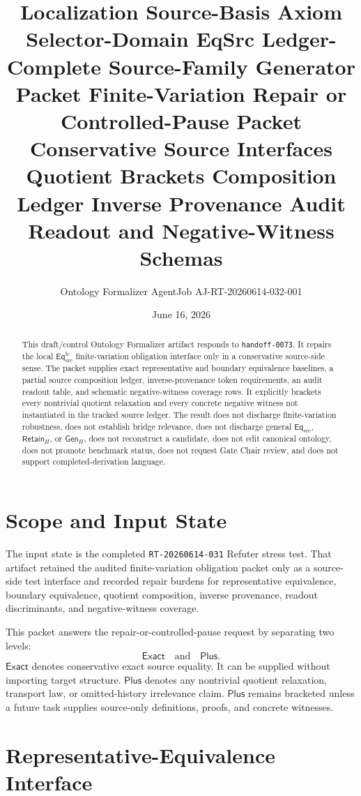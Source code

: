 \documentclass[11pt]{article}
\title{\textbf{Localization Source-Basis Axiom Selector-Domain EqSrc Ledger-Complete Source-Family Generator Packet Finite-Variation Repair or Controlled-Pause Packet}\\[0.35em]
\large Conservative Source Interfaces Quotient Brackets Composition Ledger Inverse Provenance Audit Readout and Negative-Witness Schemas}
\author{Ontology Formalizer AgentJob AJ-RT-20260614-032-001}
\date{June 16, 2026}
\newcommand{\EqSrc}{\mathsf{Eq}_{\mathrm{src}}}
\newcommand{\EqLC}{\mathsf{Eq}_{\mathrm{src}}^{\mathrm{lc}}}
\newcommand{\RetainH}{\mathsf{Retain}_{H}}
\newcommand{\GenH}{\mathsf{Gen}_{H}}
\newcommand{\Exact}{\mathsf{Exact}}
\newcommand{\Plus}{\mathsf{Plus}}
\begin{document}
\maketitle

\begin{abstract}
This draft/control Ontology Formalizer artifact responds to
\texttt{handoff-0073}. It repairs the local \(\EqLC\)
finite-variation obligation interface only in a conservative
source-side sense. The packet supplies exact representative and
boundary equivalence baselines, a partial source composition ledger,
inverse-provenance token requirements, an audit readout table, and
schematic negative-witness coverage rows. It explicitly brackets every
nontrivial quotient relaxation and every concrete negative witness not
instantiated in the tracked source ledger. The result does not
discharge finite-variation robustness, does not establish bridge
relevance, does not discharge general \(\EqSrc\), \(\RetainH\), or
\(\GenH\), does not reconstruct a candidate, does not edit canonical
ontology, does not promote benchmark status, does not request Gate
Chair review, and does not support completed-derivation language.
\end{abstract}

\section{Scope and Input State}

The input state is the completed \texttt{RT-20260614-031} Refuter
stress test. That artifact retained the audited finite-variation
obligation packet only as a source-side test interface and recorded
repair burdens for representative equivalence, boundary equivalence,
quotient composition, inverse provenance, readout discriminants, and
negative-witness coverage.

This packet answers the repair-or-controlled-pause request by
separating two levels:
\[
\Exact \quad \text{and} \quad \Plus .
\]
\(\Exact\) denotes conservative exact source equality. It can be
supplied without importing target structure. \(\Plus\) denotes any
nontrivial quotient relaxation, transport law, or omitted-history
irrelevance claim. \(\Plus\) remains bracketed unless a future task
supplies source-only definitions, proofs, and concrete witnesses.

\section{Representative-Equivalence Interface}
\end{document}
